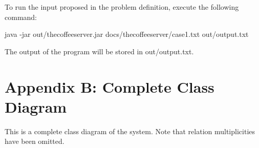 \documentclass[12pt,a4paper,oneside]{article}
\numberwithin{equation}{section}
\numberwithin{equation}{section}
\theoremstyle{definition}
\begin{document}
To run the input proposed in the problem definition, execute the following command:

\begin{listing}[style=consola, numbers=none]
java -jar out/thecoffeeserver.jar docs/thecoffeeserver/case1.txt out/output.txt
\end{listing}

The output of the program will be stored in out/output.txt.



\newpage


\section*{Appendix B: Complete Class Diagram} \label{Complete Class Diagram}


This is a complete class diagram of the system. Note that relation multiplicities have been omitted.
\end{document}

